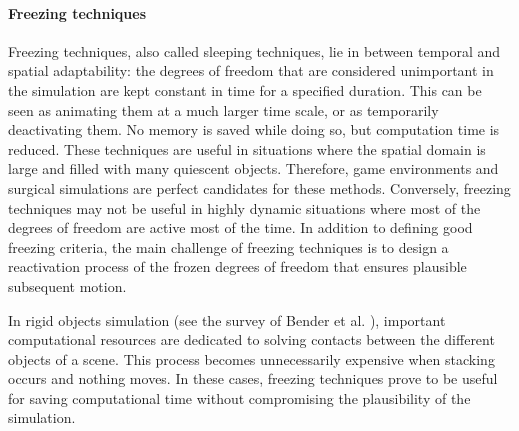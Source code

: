 \paragraph*{Freezing techniques}
Freezing techniques, also called sleeping techniques, lie in between temporal and spatial adaptability: the degrees of freedom that are considered unimportant in the simulation are kept constant in time for a specified duration.
This can be seen as animating them at a much larger time scale, or as temporarily deactivating them.
No memory is saved while doing so, but computation time is reduced.
These techniques are useful in situations where the spatial domain is large and filled with many quiescent objects.
Therefore, game environments and surgical simulations are perfect candidates for these methods.
Conversely, freezing techniques may not be useful in highly dynamic situations where most of the degrees of freedom are active most of the time.
In addition to defining good freezing criteria, the main challenge of freezing techniques is to design a reactivation process of the frozen degrees of freedom that ensures plausible subsequent motion.

In rigid objects simulation (see the survey of Bender et al. \cite{Bender2012:rigid}), important computational resources are dedicated to solving contacts between the different objects of a scene.
This process becomes unnecessarily expensive when stacking occurs and nothing moves.
In these cases, freezing techniques prove to be useful for saving computational time without compromising the plausibility of the simulation.

